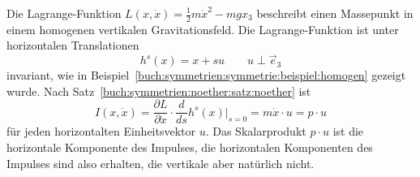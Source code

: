 \begin{beispiel}
\label{buch:symmetrien:noether:beispiel:homogen}
Die Lagrange-Funktion $L(x,\dot{x}) = \frac12m\dot{x}^2-mgx_3$ beschreibt
einen Massepunkt in einem homogenen vertikalen Gravitationsfeld.
Die Lagrange-Funktion ist unter horizontalen Translationen
\[
h^s(x) = x + su\qquad u\perp \vec{e}_3
\]
invariant,
wie in Beispiel~\ref{buch:symmetrien:symmetrie:beispiel:homogen} 
gezeigt wurde.
Nach Satz~\ref{buch:symmetrien:noether:satz:noether} ist 
\[
I(x,\dot{x})
=
\frac{\partial L}{\partial \dot{x}}\cdot \frac{d}{ds} h^s(x)
\bigg|_{s=0}
=
m\dot{x}
\cdot
u
=
p\cdot u
\]
für jeden horizontalten Einheitsvektor $u$.
Das Skalarprodukt $p\cdot u$ ist die horizontale Komponente des Impulses,
die horizontalen Komponenten des Impulses sind also erhalten, die
vertikale aber natürlich nicht.
\end{beispiel}

